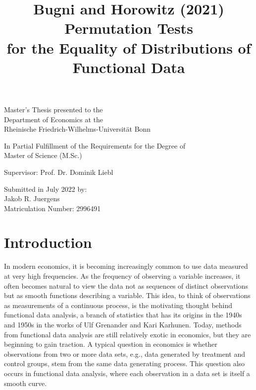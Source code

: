 \documentclass[12pt, a4paper]{article}
\theoremstyle{MAstyle} \newtheorem{assumption}{Assumption}[section]
\theoremstyle{MAstyle} \newtheorem{definition}{Definition}[section]
\theoremstyle{MAstyle} \newtheorem{theorem}{Theorem}[section]
\begin{document}
	
	\title{{\huge Bugni and Horowitz (2021) Permutation Tests\\ for the Equality of Distributions of\\ Functional Data}}
	\date{}
	\maketitle
	\thispagestyle{empty}
	\vspace{1.5 cm}
	\begin{center}
		
		\Large
		Master's Thesis presented to the\\
		Department of Economics at the\\
		Rheinische Friedrich-Wilhelms-Universität Bonn
		\vspace{1.5cm}

		\large
		In Partial Fulfillment of the Requirements for the Degree of\\
		Master of Science (M.Sc.)
		
		\vspace{3cm}
		
		Supervisor: Prof. Dr. Dominik Liebl
		
		\vspace{3cm}
		
		Submitted in July 2022 by: \\
		Jakob R. Juergens\\
		Matriculation Number: 2996491
	\end{center}
	
	\newpage
	
	\thispagestyle{empty}
	\tableofcontents
	\thispagestyle{empty}
	
	\newpage
	
	\section{Introduction}
		In modern economics, it is becoming increasingly common to use data measured at very high frequencies. As the frequency of observing a variable increases, it often becomes natural to view the data not as sequences of distinct observations but as smooth functions describing a variable.
		This idea, to think of observations as measurements of a continuous process, is the motivating thought behind functional data analysis, a branch of statistics that has its origins in the 1940s and 1950s in the works of Ulf Grenander and Kari Karhunen. Today, methods from functional data analysis are still relatively exotic in economics, but they are beginning to gain traction.
		A typical question in economics is whether observations from two or more data sets, e.g., data generated by treatment and control groups, stem from the same data generating process.			
		This question also occurs in functional data analysis, where each observation in a data set is itself a smooth curve. \\
		
\end{document}
